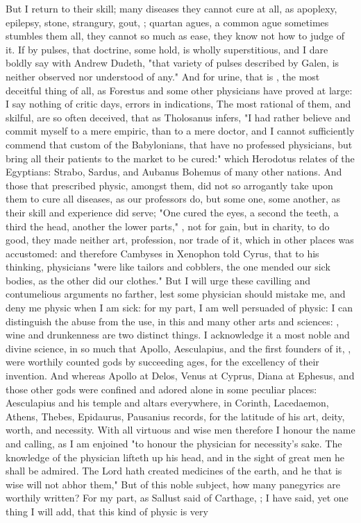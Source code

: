 {But I return to their skill; many diseases they cannot cure at all, as apoplexy, epilepsy, stone, strangury, gout, ; quartan agues, a common ague sometimes stumbles them all, they cannot so much as ease, they know not how to judge of it. If by pulses, that doctrine, some hold, is wholly superstitious, and I dare boldly say with Andrew Dudeth, "that variety of pulses described by Galen, is neither observed nor understood of any." And for urine, that is , the most deceitful thing of all, as Forestus and some other physicians have proved at large: I say nothing of critic days, errors in indications, \etc{} The most rational of them, and skilful, are so often deceived, that as Tholosanus infers, "I had rather believe and commit myself to a mere empiric, than to a mere doctor, and I cannot sufficiently commend that custom of the Babylonians, that have no professed physicians, but bring all their patients to the market to be cured:" which Herodotus relates of the Egyptians: Strabo, Sardus, and Aubanus Bohemus of many other nations. And those that prescribed physic, amongst them, did not so arrogantly take upon them to cure all diseases, as our professors do, but some one, some another, as their skill and experience did serve; "One cured the eyes, a second the teeth, a third the head, another the lower parts," \etc{}, not for gain, but in charity, to do good, they made neither art, profession, nor trade of it, which in other places was accustomed: and therefore Cambyses in Xenophon told Cyrus, that to his thinking, physicians "were like tailors and cobblers, the one mended our sick bodies, as the other did our clothes." But I will urge these cavilling and contumelious arguments no farther, lest some physician should mistake me, and deny me physic when I am sick: for my part, I am well persuaded of physic: I can distinguish the abuse from the use, in this and many other arts and sciences: , wine and drunkenness are two distinct things. I acknowledge it a most noble and divine science, in so much that Apollo, Aesculapius, and the first founders of it, , were worthily counted gods by succeeding ages, for the excellency of their invention. And whereas Apollo at Delos, Venus at Cyprus, Diana at Ephesus, and those other gods were confined and adored alone in some peculiar places: Aesculapius and his temple and altars everywhere, in Corinth, Lacedaemon, Athens, Thebes, Epidaurus, \etc{} Pausanius records, for the latitude of his art, deity, worth, and necessity. With all virtuous and wise men therefore I honour the name and calling, as I am enjoined "to honour the physician for necessity's sake. The knowledge of the physician lifteth up his head, and in the sight of great men he shall be admired. The Lord hath created medicines of the earth, and he that is wise will not abhor them,"  But of this noble subject, how many panegyrics are worthily written? For my part, as Sallust said of Carthage, ; I have said, yet one thing I will add, that this kind of physic is very }
